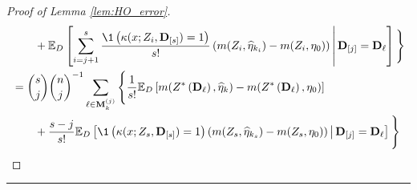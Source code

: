 \begin{proof}[Proof of Lemma \ref{lem:HO_error}]
\begin{equation}
\begin{aligned}
                & \quad \quad + \E_{D}\left[\sum_{i = j + 1}^{s}\frac{\1\left(\kappa(x; Z_{i}, \mathbf{D}_{[s]}) = 1\right)}{s!} \left(m(Z_{i}, \hat{\eta}_{k_i}) - m(Z_{i}, \eta_{0})\right)
            \, \middle| \, \mathbf{D}_{[j]} = \mathbf{D}_{\ell}\right] \Bigg\}\\
            & = \binom{s}{j}\binom{n}{j}^{-1} \sum_{\ell \in \mathbf{M}_{k}^{(j)}} \Bigg\{\frac{1}{s!} \E_{D}\left[
                m(Z^{*}\left(\mathbf{D}_{\ell}\right), \hat{\eta}_{k}) - m(Z^{*}\left(\mathbf{D}_{\ell}\right), \eta_{0})\right]\\
                & \quad \quad + \frac{s-j}{s!}\E_{D}\left[\1\left(\kappa(x; Z_{s}, \mathbf{D}_{[s]}) = 1\right) \left(m(Z_{s}, \hat{\eta}_{k_s}) - m(Z_{s}, \eta_{0})\right)
            \, \middle| \, \mathbf{D}_{[j]} = \mathbf{D}_{\ell}\right] \Bigg\}\\
        \end{aligned}
    \end{equation}
\end{proof}

\hrule